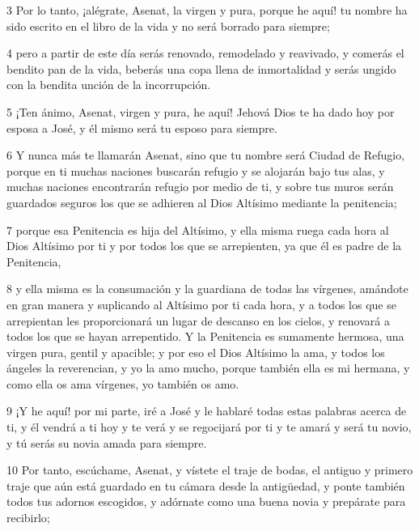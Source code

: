 \par 3 Por lo tanto, ¡alégrate, Asenat, la virgen y pura, porque he aquí! tu nombre ha sido escrito en el libro de la vida y no será borrado para siempre;

\par 4 pero a partir de este día serás renovado, remodelado y reavivado, y comerás el bendito pan de la vida, beberás una copa llena de inmortalidad y serás ungido con la bendita unción de la incorrupción.

\par 5 ¡Ten ánimo, Asenat, virgen y pura, he aquí! Jehová Dios te ha dado hoy por esposa a José, y él mismo será tu esposo para siempre.

\par 6 Y nunca más te llamarán Asenat, sino que tu nombre será Ciudad de Refugio, porque en ti muchas naciones buscarán refugio y se alojarán bajo tus alas, y muchas naciones encontrarán refugio por medio de ti, y sobre tus muros serán guardados seguros los que se adhieren al Dios Altísimo mediante la penitencia;

\par 7 porque esa Penitencia es hija del Altísimo, y ella misma ruega cada hora al Dios Altísimo por ti y por todos los que se arrepienten, ya que él es padre de la Penitencia,

\par 8 y ella misma es la consumación y la guardiana de todas las vírgenes, amándote en gran manera y suplicando al Altísimo por ti cada hora, y a todos los que se arrepientan les proporcionará un lugar de descanso en los cielos, y renovará a todos los que se hayan arrepentido. Y la Penitencia es sumamente hermosa, una virgen pura, gentil y apacible; y por eso el Dios Altísimo la ama, y ​​todos los ángeles la reverencian, y yo la amo mucho, porque también ella es mi hermana, y como ella os ama vírgenes, yo también os amo.

\par 9 ¡Y he aquí! por mi parte, iré a José y le hablaré todas estas palabras acerca de ti, y él vendrá a ti hoy y te verá y se regocijará por ti y te amará y será tu novio, y tú serás su novia amada para siempre.

\par 10 Por tanto, escúchame, Asenat, y vístete el traje de bodas, el antiguo y primero traje que aún está guardado en tu cámara desde la antigüedad, y ponte también todos tus adornos escogidos, y adórnate como una buena novia y prepárate para recibirlo;

